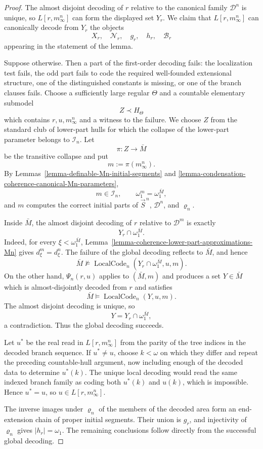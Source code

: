 \documentclass[a4paper,11pt]{article}
\begin{document}
\begin{proof}
The almost disjoint decoding of $r$ relative to the canonical family
$\mathcal D^n$ is unique, so $L[r,m^n_\infty]$ can form the displayed set
$Y_r$.  We claim that $L[r,m^n_\infty]$ can canonically decode from $Y_r$ the
objects
\[
   X_r,\quad \mathcal N_r,\quad g_r,\quad h_r,\quad \mathcal B_r
\]
appearing in the statement of the lemma.

Suppose otherwise.  Then a part of the first-order decoding fails:
the localization test fails, the odd part fails to code the required well-founded
extensional structure, one of the distinguished constants is missing, or one
of the branch clauses fails.  Choose a sufficiently large regular $\Theta$
and a countable elementary submodel
\[
   Z\prec H_\Theta
\]
which contains $r,u,m^n_\infty$ and a witness to the failure.  We choose $Z$
from the standard club of lower-part hulls for which the collapse of the
lower-part parameter belongs to $\mathcal I_n$.  Let
\[
   \pi:Z\longrightarrow\bar M
\]
be the transitive collapse and put
\[
   m:=\pi(m^n_\infty).
\]
By Lemmas~\ref{lemma-definable-Mn-initial-segments} and
\ref{lemma-condensation-coherence-canonical-Mn-parameters},
\[
   m\in\mathcal I_n,
   \qquad
   \omega_1^m=\omega_1^{\bar M},
\]
and $m$ computes the correct initial parts of
$\vec S^{\,n}$, $\mathcal D^n$, and $\varrho_n$.

Inside $\bar M$, the almost disjoint decoding of $r$ relative to
$\mathcal D^m$ is exactly
\[
   Y_r\cap\omega_1^{\bar M}.
\]
Indeed, for every $\xi<\omega_1^{\bar M}$,
Lemma~\ref{lemma-coherence-lower-part-approximations-Mn} gives
$d^m_\xi=d^n_\xi$.  The failure of the global decoding reflects to
$\bar M$, and hence
\[
   \bar M\not\models
   \operatorname{LocalCode}_n
      (Y_r\cap\omega_1^{\bar M},u,m).
\]
On the other hand, $\Psi_n(r,u)$ applies to $(\bar M,m)$ and produces a set
$Y\in\bar M$ which is almost-disjointly decoded from $r$ and satisfies
\[
   \bar M\models\operatorname{LocalCode}_n(Y,u,m).
\]
The almost disjoint decoding is unique, so
\[
   Y=Y_r\cap\omega_1^{\bar M},
\]
a contradiction.  Thus the global decoding succeeds.

Let $u^*$ be the real read in $L[r,m^n_\infty]$ from the parity of the tree
indices in the decoded branch sequence.  If $u^*\neq u$, choose
$k<\omega$ on which they differ and repeat the preceding countable-hull
argument, now including enough of the decoded data to determine $u^*(k)$.
The unique local decoding would read the same indexed branch family as coding
both $u^*(k)$ and $u(k)$, which is impossible.  Hence $u^*=u$, so
$u\in L[r,m^n_\infty]$.

The inverse images under $\varrho_n$ of the members of the decoded area form
an end-extension chain of proper initial segments.  Their union is
$g_r$, and injectivity of $\varrho_n$ gives $|h_r|=\omega_1$.  The remaining
conclusions follow directly from the successful global decoding.
\end{proof}
\end{document}
